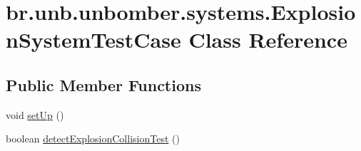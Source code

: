 \hypertarget{classbr_1_1unb_1_1unbomber_1_1systems_1_1_explosion_system_test_case}{\section{br.\+unb.\+unbomber.\+systems.\+Explosion\+System\+Test\+Case Class Reference}
\label{classbr_1_1unb_1_1unbomber_1_1systems_1_1_explosion_system_test_case}
}
\subsection*{Public Member Functions}
\begin{DoxyCompactItemize}
\item 
void \hyperlink{classbr_1_1unb_1_1unbomber_1_1systems_1_1_explosion_system_test_case_a40432fa08ceba5fde29b95c14e2fffb8}{set\+Up} ()
\item 
boolean \hyperlink{classbr_1_1unb_1_1unbomber_1_1systems_1_1_explosion_system_test_case_aadb66319367e915f8e0d87a3124c9b92}{detect\+Explosion\+Collision\+Test} ()
\end{DoxyCompactItemize}


